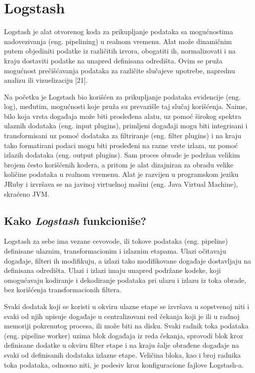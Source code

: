 \section{Logstash}
Logstash je alat otvorenog koda za prikupljanje podataka sa mogućnostima nadovezivanja (eng. pipelining) u realnom vremenu. Alat može dinamičnim putem objediniti podatke iz različitih izvora, obogatiti ih, normalizovati i na kraju dostaviti podatke na unapred definisana odredišta. Ovim se pruža mogućnost prečišćavanja podataka za različite slučajeve upotrebe, naprednu analizu ili vizuelizaciju [21].

\par
Na početku je Logstash bio korišćen za prikupljanje podataka evidencije (eng. log), međutim, mogućnosti koje pruža su prevazišle taj slučaj korišćenja. Naime, bilo koja vrsta događaja može biti prosleđena alatu, uz pomoć širokog spektra ulaznih dodataka (eng. input plugins), primljeni događaji mogu biti integrisani i transformisani uz pomoć dodataka za filtriranje (eng. filter plugins) i na kraju tako formatirani podaci mogu biti prosleđeni na razne vrste izlaza, uz pomoć izlazih dodataka (eng. output plugins). Sam proces obrade je podržan velikim brojem često korišćenih kodera, a pritom je alat dizajniran za obradu velike količine podataka u realnom vremenu. Alat je razvijen u programskom jeziku JRuby i izvršava se na javinoj virtuelnoj mašini (eng. Java Virtual Machine), skraćeno JVM.

\subsection{Kako \textit{Logstash} funkcioniše?}
Logstash za sebe ima vezane cevovode, ili tokove podataka (eng. pipeline) definisane ulaznim, transformacionim i izlaznim etapama. Ulazi očitavaju događaje, filteri ih modifikuju, a izlazi tako modifikovane događaje dostavljaju na definisana odredišta. Ulazi i izlazi imaju unapred podržane kodeke, koji omogućavaju kodiranje i dekodiranje podataka pri ulazu i izlazu iz toka obrade, bez korišćenja transformacionih filtera.

\par
Svaki dodatak koji se koristi u okviru ulazne etape se izvršava u sopstvenoj niti i svaki od njih upisuje događaje u centralizovani red čekanja koji je ili u radnoj memoriji pokrenutog procesa, ili može biti na disku. Svaki radnik toka podataka (eng. pipeline worker) uzima blok događaja iz reda čekanja, sprovodi blok kroz definisane dodatke u okviru filter etape i na kraju šalje obrađene događaje na svaki od definisanih dodataka izlazne etape. Veličina bloka, kao i broj radnika toka podataka, odnosno niti, je podesiv kroz konfiguracione fajlove Logstash-a.

